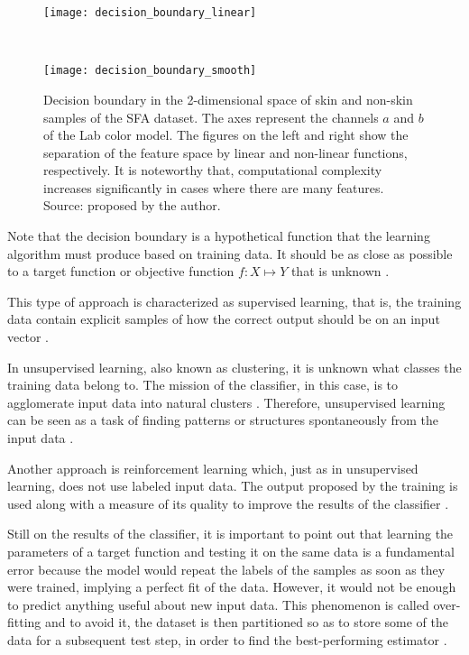 \begin{figure}[ht]
    \centering
    \begin{minipage}{0.48\textwidth}
        \texttt{[image: decision\_boundary\_linear]}
        \label{fig:decision_boundary_linear}
    \end{minipage}
    ~ %
    \begin{minipage}{0.48\textwidth}
        \texttt{[image: decision\_boundary\_smooth]}
        \label{fig:decision_boundary_smooth}
    \end{minipage}
    \caption[Decision boundary in the 2-dimensional space]{Decision boundary in the 2-dimensional space of skin and non-skin samples of the SFA dataset. The axes represent the channels $a$ and $b$ of the Lab color model. The figures on the left and right show the separation of the feature space by linear and non-linear functions, respectively. It is noteworthy that, computational complexity increases significantly in cases where there are many features. Source: proposed by the author.}
    \label{fig:decision_boundary}
\end{figure}

Note that the decision boundary is a hypothetical function that the learning algorithm must produce based on training data. It should be as close as possible to a target function or objective function $f: X \mapsto Y$ that is unknown \citep{mostafa:12}.

This type of approach is characterized as supervised learning, that is, the training data contain explicit samples of how the correct output should be on an input vector \citep{mostafa:12}.

In unsupervised learning, also known as clustering, it is unknown what classes the training data belong to. The mission of the classifier, in this case, is to agglomerate input data into natural clusters \citep{duda:12}. Therefore, unsupervised learning can be seen as a task of finding patterns or structures spontaneously from the input data \citep{mostafa:12}.

Another approach is reinforcement learning which, just as in unsupervised learning, does not use labeled input data. The output proposed by the training is used along with a measure of its quality to improve the results of the classifier \citep{mostafa:12}.

Still on the results of the classifier, it is important to point out that learning the parameters of a target function and testing it on the same data is a fundamental error because the model would repeat the labels of the samples as soon as they were trained, implying a perfect fit of the data. However, it would not be enough to predict anything useful about new input data. This phenomenon is called over-fitting and to avoid it, the dataset is then partitioned so as to store some of the data for a subsequent test step, in order to find the best-performing estimator \citep{mostafa:12}.

